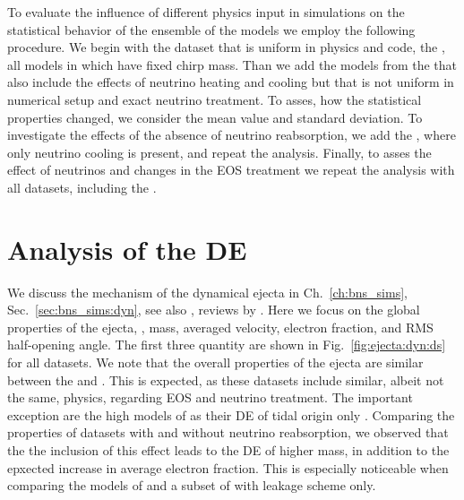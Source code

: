 To evaluate the influence of different physics input in simulations 
on the statistical behavior of the ensemble of the models we employ the following procedure.
%
We begin with the dataset that is uniform in physics and code, the \DSrefset{},
all models in which have fixed chirp mass.
Than we add the models from the \DSheatcool{} that also include the effects of neutrino 
heating and cooling but that is not uniform in numerical setup and exact neutrino treatment.
To asses, how the statistical properties changed, we consider the mean value and standard deviation.
To investigate the effects of the absence of neutrino reabsorption, we add the \DScool{},  
where only neutrino cooling is present, and repeat the analysis.
Finally, to asses the effect of neutrinos and changes in the \ac{EOS} treatment 
we repeat the analysis with all datasets, including the \DSnone{}.


\section{Analysis of the \ac{DE}}
\label{sec:res_stat_dynej}

We discuss the mechanism of the dynamical ejecta in Ch.~\ref{ch:bns_sims}, 
Sec.~\ref{sec:bns_sims:dyn}, see also \eg, reviews by 
\citet{Radice:2020ddv,Bernuzzi:2020tgt,Shibata:2019wef}. 
%
Here we focus on the global properties of the ejecta, \ie, mass, averaged velocity, 
electron fraction, and \ac{RMS} half-opening angle. The first three quantity are shown in 
Fig.~\ref{fig:ejecta:dyn:ds} for all datasets. We note that the overall properties of the 
ejecta are similar between the \DSrefset{} and \DSheatcool{}. This is expected, as these 
datasets include similar, albeit not the same, physics, regarding \ac{EOS} and neutrino treatment.
The important exception are the high \mr{} models of \DSrefset{} as their \ac{DE} of tidal 
origin only \citep{Bernuzzi:2020txg}.
Comparing the properties of datasets with and without neutrino reabsorption, we observed 
that the the inclusion of this effect leads to the \ac{DE} of higher mass, in addition to 
the epxected increase in average electron fraction. This is especially noticeable when 
comparing the models of \DSrefset{} and a subset of \citet{Radice:2018pdn} with leakage scheme only.

